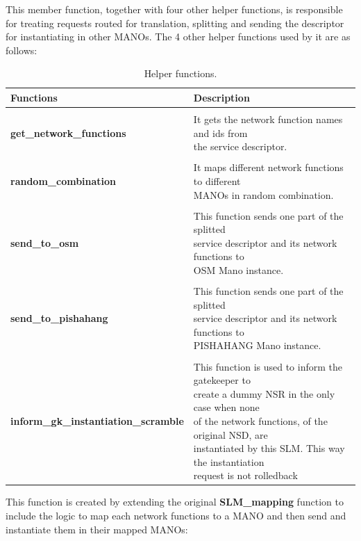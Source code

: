 This member function, together with four other helper functions, is responsible for treating requests routed for translation, splitting and sending the descriptor for instantiating in other MANOs. The 4 other helper functions used by it are as follows:
\begin{table}[H]
	\begin{center}
		\caption{Helper functions.}
		\label{tab:table2}
		\begin{tabular}{l|l} 
			\textbf{Functions} & \textbf{Description} \\
			\hline\\
			\textbf{get\_network\_functions} & \makecell[l]{It gets the network function names and ids from \\ the service descriptor.} \\\\
			\textbf{random\_combination} & \makecell[l]{It maps different network functions to different \\ MANOs in random combination.}  \\\\
			\textbf{send\_to\_osm} & \makecell[l]{This function sends one part of the splitted \\ service descriptor and its network functions to \\OSM Mano instance.} \\\\
			\textbf{send\_to\_pishahang} & \makecell[l]{This function sends one part of the splitted \\ service descriptor and its network functions to \\ PISHAHANG Mano instance.}\\\\
			\textbf{inform\_gk\_instantiation\_scramble} & \makecell[l]{This function is used to inform the gatekeeper to \\ create a dummy NSR in the only case when none \\ of the network functions, of the original NSD, are \\ instantiated by this SLM. This way the instantiation \\ request is not rolledback}
		\end{tabular}
	\end{center}
\end{table}

This function is created by extending the original \textbf{SLM\_mapping} function to include the logic to map each network functions to a MANO and then send and instantiate them in their mapped MANOs:

